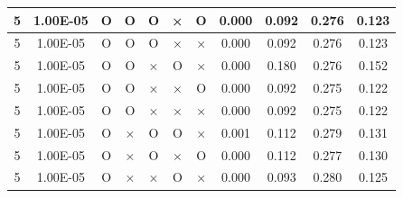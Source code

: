 \documentclass[11pt]{article}
\begin{document}
\begin{longtable}[h]{|r|r|l|l|l|l|l|r|r|l|r|}
\multicolumn{1}{|c|}{5} & \multicolumn{1}{c|}{1.00E-05} & \multicolumn{1}{c|}{O} & \multicolumn{1}{c|}{O} & \multicolumn{1}{c|}{O} & \multicolumn{1}{c|}{×} & \multicolumn{1}{c|}{O} & \multicolumn{1}{c|}{0.000} & \multicolumn{1}{c|}{0.092} & \multicolumn{1}{c|}{0.276} & \multicolumn{1}{c|}{0.123} \\ \hline
\multicolumn{1}{|c|}{5} & \multicolumn{1}{c|}{1.00E-05} & \multicolumn{1}{c|}{O} & \multicolumn{1}{c|}{O} & \multicolumn{1}{c|}{O} & \multicolumn{1}{c|}{×} & \multicolumn{1}{c|}{×} & \multicolumn{1}{c|}{0.000} & \multicolumn{1}{c|}{0.092} & \multicolumn{1}{c|}{0.276} & \multicolumn{1}{c|}{0.123} \\ \hline
\multicolumn{1}{|c|}{5} & \multicolumn{1}{c|}{1.00E-05} & \multicolumn{1}{c|}{O} & \multicolumn{1}{c|}{O} & \multicolumn{1}{c|}{×} & \multicolumn{1}{c|}{O} & \multicolumn{1}{c|}{×} & \multicolumn{1}{c|}{0.000} & \multicolumn{1}{c|}{0.180} & \multicolumn{1}{c|}{0.276} & \multicolumn{1}{c|}{0.152} \\ \hline
\multicolumn{1}{|c|}{5} & \multicolumn{1}{c|}{1.00E-05} & \multicolumn{1}{c|}{O} & \multicolumn{1}{c|}{O} & \multicolumn{1}{c|}{×} & \multicolumn{1}{c|}{×} & \multicolumn{1}{c|}{O} & \multicolumn{1}{c|}{0.000} & \multicolumn{1}{c|}{0.092} & \multicolumn{1}{c|}{0.275} & \multicolumn{1}{c|}{0.122} \\ \hline
\multicolumn{1}{|c|}{5} & \multicolumn{1}{c|}{1.00E-05} & \multicolumn{1}{c|}{O} & \multicolumn{1}{c|}{O} & \multicolumn{1}{c|}{×} & \multicolumn{1}{c|}{×} & \multicolumn{1}{c|}{×} & \multicolumn{1}{c|}{0.000} & \multicolumn{1}{c|}{0.092} & \multicolumn{1}{c|}{0.275} & \multicolumn{1}{c|}{0.122} \\ \hline
\multicolumn{1}{|c|}{5} & \multicolumn{1}{c|}{1.00E-05} & \multicolumn{1}{c|}{O} & \multicolumn{1}{c|}{×} & \multicolumn{1}{c|}{O} & \multicolumn{1}{c|}{O} & \multicolumn{1}{c|}{×} & \multicolumn{1}{c|}{0.001} & \multicolumn{1}{c|}{0.112} & \multicolumn{1}{c|}{0.279} & \multicolumn{1}{c|}{0.131} \\ \hline
\multicolumn{1}{|c|}{5} & \multicolumn{1}{c|}{1.00E-05} & \multicolumn{1}{c|}{O} & \multicolumn{1}{c|}{×} & \multicolumn{1}{c|}{O} & \multicolumn{1}{c|}{×} & \multicolumn{1}{c|}{O} & \multicolumn{1}{c|}{0.000} & \multicolumn{1}{c|}{0.112} & \multicolumn{1}{c|}{0.277} & \multicolumn{1}{c|}{0.130} \\ \hline
\multicolumn{1}{|c|}{5} & \multicolumn{1}{c|}{1.00E-05} & \multicolumn{1}{c|}{O} & \multicolumn{1}{c|}{×} & \multicolumn{1}{c|}{×} & \multicolumn{1}{c|}{O} & \multicolumn{1}{c|}{×} & \multicolumn{1}{c|}{0.000} & \multicolumn{1}{c|}{0.093} & \multicolumn{1}{c|}{0.280} & \multicolumn{1}{c|}{0.125} \\ \hline

\end{longtable}
\end{document}
